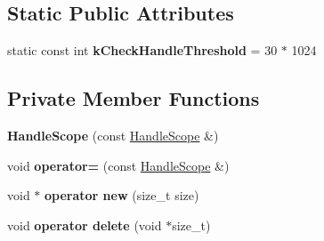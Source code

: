 \subsection*{Static Public Attributes}
\begin{DoxyCompactItemize}
\item 
static const int {\bfseries k\+Check\+Handle\+Threshold} = 30 $\ast$ 1024\hypertarget{classv8_1_1internal_1_1_handle_scope_aba5a5d86706677947f728ef03adddee3}{}\label{classv8_1_1internal_1_1_handle_scope_aba5a5d86706677947f728ef03adddee3}

\end{DoxyCompactItemize}
\subsection*{Private Member Functions}
\begin{DoxyCompactItemize}
\item 
{\bfseries Handle\+Scope} (const \hyperlink{classv8_1_1internal_1_1_handle_scope}{Handle\+Scope} \&)\hypertarget{classv8_1_1internal_1_1_handle_scope_ad86a744f9b543e8293a2eb30cbe91dad}{}\label{classv8_1_1internal_1_1_handle_scope_ad86a744f9b543e8293a2eb30cbe91dad}

\item 
void {\bfseries operator=} (const \hyperlink{classv8_1_1internal_1_1_handle_scope}{Handle\+Scope} \&)\hypertarget{classv8_1_1internal_1_1_handle_scope_a5f00c03c5e1b51538e675c8615a27c4f}{}\label{classv8_1_1internal_1_1_handle_scope_a5f00c03c5e1b51538e675c8615a27c4f}

\item 
void $\ast$ {\bfseries operator new} (size\+\_\+t size)\hypertarget{classv8_1_1internal_1_1_handle_scope_a0ced868d4b5c4d10886b580057611d45}{}\label{classv8_1_1internal_1_1_handle_scope_a0ced868d4b5c4d10886b580057611d45}

\item 
void {\bfseries operator delete} (void $\ast$size\+\_\+t)\hypertarget{classv8_1_1internal_1_1_handle_scope_ae5b40eb957fa6846fbbbc764c30d6739}{}\label{classv8_1_1internal_1_1_handle_scope_ae5b40eb957fa6846fbbbc764c30d6739}

\end{DoxyCompactItemize}
